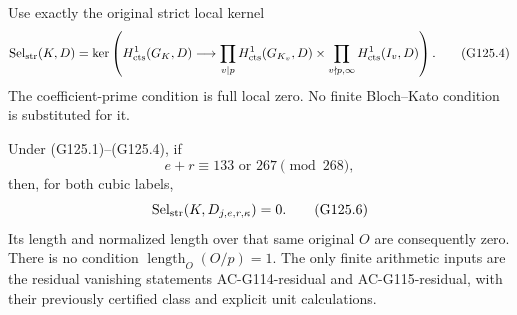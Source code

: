 Use exactly the original strict local kernel
\[
 \operatorname{Sel}_{\rm str}(K,D)=\ker\left(
 H^1_{\rm cts}(G_K,D)\longrightarrow
 \prod_{v\mid p}H^1_{\rm cts}(G_{K_v},D)
 \times\prod_{v\nmid p,\infty}H^1_{\rm cts}(I_v,D)\right).
 \tag{G125.4}
\]
The coefficient-prime condition is full local zero.  No finite
Bloch--Kato condition is substituted for it.

\begin{theorem}
\label{thm:ACG125lifts}
Under (G125.1)--(G125.4), if
\[
                         e+r\equiv133\text{ or }267\pmod{268},
 \tag{G125.5}
\]
then, for both cubic labels,
\[
 \operatorname{Sel}_{\rm str}(K,D_{j,e,r,\kappa})=0.
 \tag{G125.6}
\]
Its length and normalized length over that same original \(O\)
are consequently zero.  There is no condition
\(\operatorname{length}_O(O/p)=1\).
The only finite arithmetic inputs are the residual vanishing
statements AC-G114-residual and AC-G115-residual, with their
previously certified class and explicit unit calculations.
\end{theorem}

